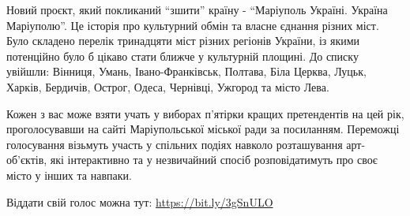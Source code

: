Новий проєкт, який покликаний \enquote{зшити} країну -  \enquote{Маріуполь Україні. Україна
Маріуполю}. Це історія про культурний обмін та власне єднання різних міст. Було
складено перелік тринадцяти міст різних регіонів України, із якими потенційно
було б цікаво стати ближче у культурній площині. До списку увійшли: Вінниця,
Умань, Івано-Франківськ, Полтава, Біла Церква, Луцьк, Харків, Бердичів, Острог,
Одеса, Чернівці, Ужгород та місто Лева.

Кожен з вас може взяти учать у виборах п'ятірки кращих претендентів на цей рік,
проголосувавши на сайті Маріупольської міської ради за посиланням. Переможці
голосування візьмуть участь у спільних подіях навколо розташування
арт-об'єктів, які інтерактивно та у незвичайний спосіб розповідатимуть про своє
місто у інших та навпаки.

Віддати свій голос можна тут: \url{https://bit.ly/3gSnULO}
